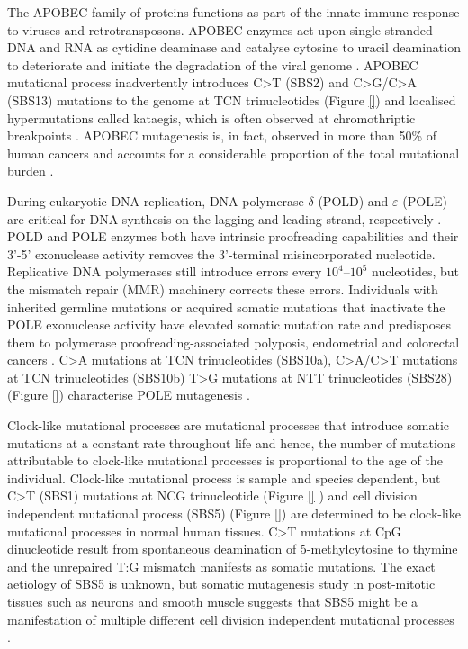 The APOBEC family of proteins functions as part of the innate immune response to viruses and retrotransposons. APOBEC enzymes act upon single-stranded DNA and RNA as cytidine deaminase and catalyse cytosine to uracil deamination to deteriorate and initiate the degradation of the viral genome \cite{}. APOBEC mutational process inadvertently introduces C>T (SBS2) and C>G/C>A (SBS13) mutations to the genome at TCN trinucleotides (Figure \ref{}) \cite{} and localised hypermutations called kataegis, which is often observed at chromothriptic breakpoints \cite{}. APOBEC mutagenesis is, in fact, observed in more than 50\% of human cancers and accounts for a considerable proportion of the total mutational burden \cite{}.

During eukaryotic DNA replication, DNA polymerase $\delta$ (POLD) and $\varepsilon$ (POLE) are critical for DNA synthesis on the lagging and leading strand, respectively \cite{}. POLD and POLE enzymes both have intrinsic proofreading capabilities and their 3’-5’ exonuclease activity removes the 3’-terminal misincorporated nucleotide. Replicative DNA polymerases still introduce errors every $10^4 – 10^5$ nucleotides, but the mismatch repair (MMR) machinery corrects these errors. Individuals with inherited germline mutations or acquired somatic mutations that inactivate the POLE exonuclease activity have elevated somatic mutation rate and predisposes them to polymerase proofreading-associated polyposis, endometrial and colorectal cancers \cite{}. C>A mutations at TCN trinucleotides (SBS10a), C>A/C>T mutations at TCN trinucleotides (SBS10b) T>G mutations at NTT trinucleotides (SBS28) (Figure \ref{}) characterise POLE mutagenesis \cite{}. 

Clock-like mutational processes are mutational processes that introduce somatic mutations at a constant rate throughout life and hence, the number of mutations attributable to clock-like mutational processes is proportional to the age of the individual. Clock-like mutational process is sample and species dependent, but C>T (SBS1) mutations at NCG trinucleotide (Figure \ref{} ) and cell division independent mutational process (SBS5) (Figure \ref{}) \cite{} are determined to be clock-like mutational processes in normal human tissues. C>T mutations at CpG dinucleotide result from spontaneous deamination of 5-methylcytosine to thymine and the unrepaired T:G mismatch manifests as somatic mutations. The exact aetiology of SBS5 is unknown, but somatic mutagenesis study in post-mitotic tissues such as neurons and smooth muscle suggests that SBS5 might be a manifestation of multiple different cell division independent mutational processes \cite{}.

